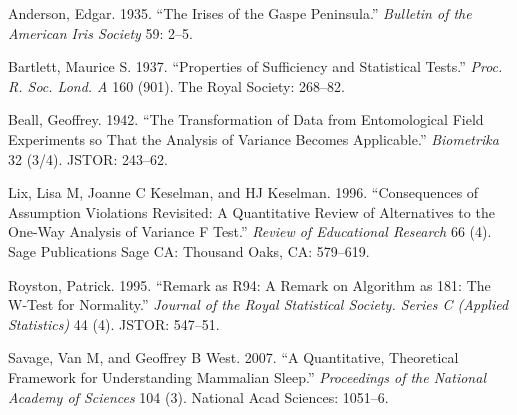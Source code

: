 \documentclass[]{article}
\begin{document}
\hypertarget{refs}{}
\hypertarget{ref-anderson1935irises}{}
Anderson, Edgar. 1935. ``The Irises of the Gaspe Peninsula.''
\emph{Bulletin of the American Iris Society} 59: 2--5.

\hypertarget{ref-bartlett1937properties}{}
Bartlett, Maurice S. 1937. ``Properties of Sufficiency and Statistical
Tests.'' \emph{Proc. R. Soc. Lond. A} 160 (901). The Royal Society:
268--82.

\hypertarget{ref-beall1942transformation}{}
Beall, Geoffrey. 1942. ``The Transformation of Data from Entomological
Field Experiments so That the Analysis of Variance Becomes Applicable.''
\emph{Biometrika} 32 (3/4). JSTOR: 243--62.

\hypertarget{ref-lix1996consequences}{}
Lix, Lisa M, Joanne C Keselman, and HJ Keselman. 1996. ``Consequences of
Assumption Violations Revisited: A Quantitative Review of Alternatives
to the One-Way Analysis of Variance F Test.'' \emph{Review of
Educational Research} 66 (4). Sage Publications Sage CA: Thousand Oaks,
CA: 579--619.

\hypertarget{ref-royston1995remark}{}
Royston, Patrick. 1995. ``Remark as R94: A Remark on Algorithm as 181:
The W-Test for Normality.'' \emph{Journal of the Royal Statistical
Society. Series C (Applied Statistics)} 44 (4). JSTOR: 547--51.

\hypertarget{ref-savage2007quantitative}{}
Savage, Van M, and Geoffrey B West. 2007. ``A Quantitative, Theoretical
Framework for Understanding Mammalian Sleep.'' \emph{Proceedings of the
National Academy of Sciences} 104 (3). National Acad Sciences: 1051--6.
\end{document}
